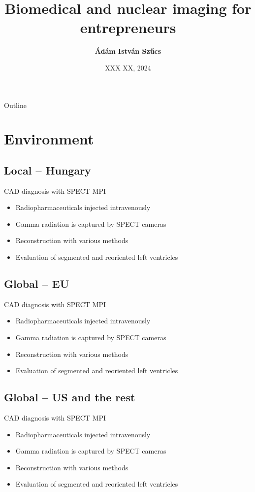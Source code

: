\documentclass[aspectratio=169]{beamer}
\title{Biomedical and nuclear imaging for entrepreneurs}
\author{ 
    \textbf{Ádám István Szűcs}
}
\date{XXX XX, 2024}
\begin{document}
\begin{frame}
    \titlepage 
\end{frame}

\begin{frame}{Outline}
    \tableofcontents
\end{frame}

\section{Environment}
\subsection{Local -- Hungary}
\begin{frame}{CAD diagnosis with SPECT MPI}
    \begin{itemize}
        \item<1-> Radiopharmaceuticals injected intravenously
        \item<2-> Gamma radiation is captured by SPECT cameras
        \item<3-> Reconstruction with various methods
        \item<4-> Evaluation of segmented and reoriented left ventricles
    \end{itemize}
\end{frame}

\subsection{Global -- EU}
\begin{frame}{CAD diagnosis with SPECT MPI}
    \begin{itemize}
        \item<1-> Radiopharmaceuticals injected intravenously
        \item<2-> Gamma radiation is captured by SPECT cameras
        \item<3-> Reconstruction with various methods
        \item<4-> Evaluation of segmented and reoriented left ventricles
    \end{itemize}
\end{frame}

\subsection{Global -- US and the rest}
\begin{frame}{CAD diagnosis with SPECT MPI}
    \begin{itemize}
        \item<1-> Radiopharmaceuticals injected intravenously
        \item<2-> Gamma radiation is captured by SPECT cameras
        \item<3-> Reconstruction with various methods
        \item<4-> Evaluation of segmented and reoriented left ventricles
    \end{itemize}
\end{frame}
\end{document}
